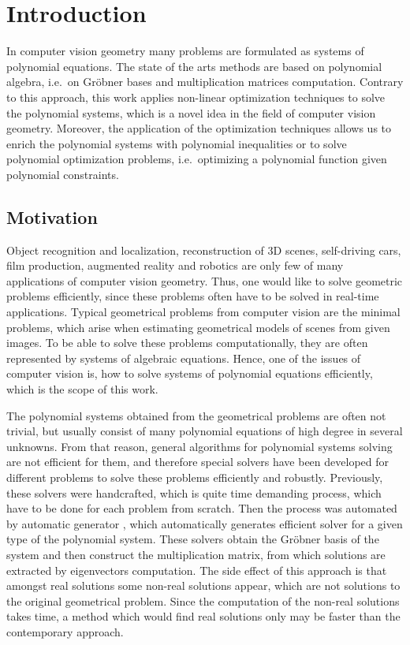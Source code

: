 \chapter{Introduction}
In computer vision geometry many problems are formulated as systems of polynomial equations.
The state of the arts methods are based on polynomial algebra, i.e.\ on Gr\"obner bases and multiplication matrices computation.
Contrary to this approach, this work applies non-linear optimization techniques to solve the polynomial systems, which is a novel idea in the field of computer vision geometry.
Moreover, the application of the optimization techniques allows us to enrich the polynomial systems with polynomial inequalities or to solve polynomial optimization problems, i.e.\ optimizing a polynomial function given polynomial constraints.

\section{Motivation}
Object recognition and localization, reconstruction of 3D scenes, self-driving cars, film production, augmented reality and robotics are only few of many applications of computer vision geometry.
Thus, one would like to solve geometric problems efficiently, since these problems often have to be solved in real-time applications.
Typical geometrical problems from computer vision are the minimal problems, which arise when estimating geometrical models of scenes from given images.
To be able to solve these problems computationally, they are often represented by systems of algebraic equations.
Hence, one of the issues of computer vision is, how to solve systems of polynomial equations efficiently, which is the scope of this work.

The polynomial systems obtained from the geometrical problems are often not trivial, but usually consist of many polynomial equations of high degree in several unknowns.
From that reason, general algorithms for polynomial systems solving are not efficient for them, and therefore special solvers have been developed for different problems to solve these problems efficiently and robustly.
Previously, these solvers were handcrafted, which is quite time demanding process, which have to be done for each problem from scratch.
Then the process was automated by automatic generator \cite{autogen}, which automatically generates efficient solver for a given type of the polynomial system.
These solvers obtain the Gr\"obner basis of the system and then construct the multiplication matrix, from which solutions are extracted by eigenvectors computation.
The side effect of this approach is that amongst real solutions some non-real solutions appear, which are not solutions to the original geometrical problem.
Since the computation of the non-real solutions takes time, a method which would find real solutions only may be faster than the contemporary approach.


